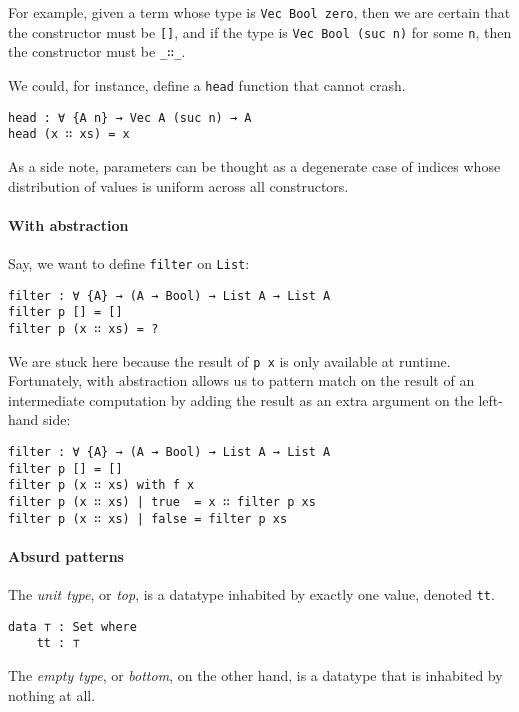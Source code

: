 \documentclass[\main/thesis.tex]{subfiles}
\begin{document}
For example, given a term whose type is {\lstinline|Vec Bool zero|},
then we are certain that the constructor must be {\lstinline|[]|},
and if the type is {\lstinline|Vec Bool (suc n)|} for some {\lstinline|n|},
then the constructor must be {\lstinline|_∷_|}.

We could, for instance, define a {\lstinline|head|} function that cannot crash.

\begin{lstlisting}
head : ∀ {A n} → Vec A (suc n) → A
head (x ∷ xs) = x
\end{lstlisting}

As a side note, parameters can be thought as a degenerate case of indices whose
distribution of values is uniform across all constructors.

\paragraph{With abstraction}


Say, we want to define {\lstinline|filter|} on {\lstinline|List|}:

\begin{lstlisting}
filter : ∀ {A} → (A → Bool) → List A → List A
filter p [] = []
filter p (x ∷ xs) = ?
\end{lstlisting}

We are stuck here because the result of {\lstinline|p x|} is only available at
runtime. Fortunately, with abstraction allows us to pattern match on the result
of an intermediate computation by adding the result as an extra argument on the
left-hand side:

\begin{lstlisting}
filter : ∀ {A} → (A → Bool) → List A → List A
filter p [] = []
filter p (x ∷ xs) with f x
filter p (x ∷ xs) | true  = x ∷ filter p xs
filter p (x ∷ xs) | false = filter p xs
\end{lstlisting}

\paragraph{Absurd patterns}

The \textit{unit type}, or \textit{top}, is a datatype inhabited by
exactly one value, denoted {\lstinline|tt|}.

\begin{lstlisting}
data ⊤ : Set where
    tt : ⊤
\end{lstlisting}

The \textit{empty type}, or \textit{bottom}, on the other hand, is a datatype
that is inhabited by nothing at all.
\end{document}
